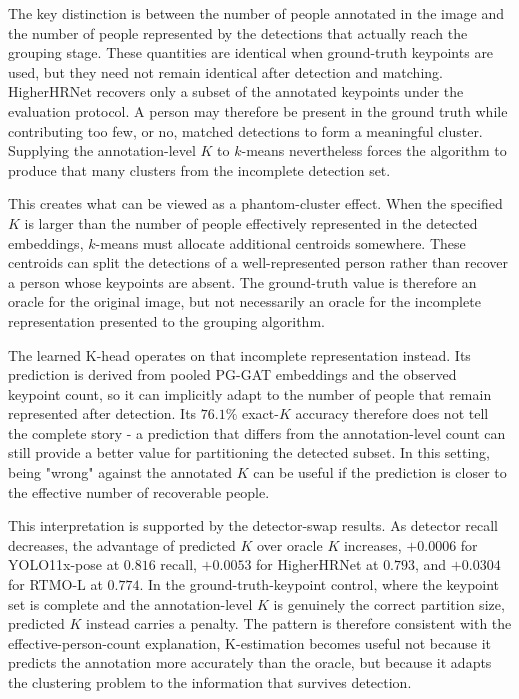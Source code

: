 The key distinction is between the number of people annotated in the
image and the number of people represented by the detections that
actually reach the grouping stage.
These quantities are identical when ground-truth keypoints are used,
but they need not remain identical after detection and matching.
HigherHRNet recovers only a subset of the annotated keypoints under the
evaluation protocol.
A person may therefore be present in the ground truth while contributing
too few, or no, matched detections to form a meaningful cluster.
Supplying the annotation-level $K$ to $k$-means nevertheless forces the
algorithm to produce that many clusters from the incomplete detection set.

This creates what can be viewed as a phantom-cluster effect.
When the specified $K$ is larger than the number of people effectively
represented in the detected embeddings,
$k$-means must allocate additional centroids somewhere.
These centroids can split the detections of a well-represented person
rather than recover a person whose keypoints are absent.
The ground-truth value is therefore an oracle for the original image,
but not necessarily an oracle for the incomplete representation
presented to the grouping algorithm.

The learned K-head operates on that incomplete representation instead.
Its prediction is derived from pooled PG-GAT embeddings and the observed
keypoint count,
so it can implicitly adapt to the number of people that remain
represented after detection.
Its $76.1\%$ exact-$K$ accuracy therefore does not tell the complete
story -
a prediction that differs from the annotation-level count can still
provide a better value for partitioning the detected subset.
In this setting, being "wrong" against the annotated $K$ can be useful
if the prediction is closer to the effective number of recoverable people.

This interpretation is supported by the detector-swap results.
As detector recall decreases, the advantage of predicted $K$ over
oracle $K$ increases,
$+0.0006$ for YOLO11x-pose at $0.816$ recall,
$+0.0053$ for HigherHRNet at $0.793$,
and $+0.0304$ for RTMO-L at $0.774$.
In the ground-truth-keypoint control, where the keypoint set is
complete and the annotation-level $K$ is genuinely the correct
partition size, predicted $K$ instead carries a penalty.
The pattern is therefore consistent with the effective-person-count
explanation,
K-estimation becomes useful not because it predicts the annotation
more accurately than the oracle,
but because it adapts the clustering problem to the information that
survives detection.

